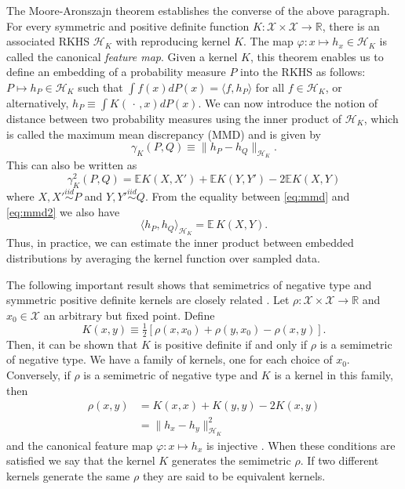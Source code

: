 \documentclass[aps,preprint,nofootinbib,floatfix]{revtex4-1}
\newcommand\E{\mathbb{E}}
\newcommand\kk{K}
\newcommand\kkk{h}
\newcommand\Hk{{\mathcal{H}}_{\kk}}
\begin{document}
The Moore-Aronszajn theorem 
\cite{Aronszajn}
establishes the converse of the above paragraph. 
For every symmetric
and positive definite function $\kk: \mathcal{X}\times \mathcal{X} \to
\mathbb{R}$, there is an associated RKHS $\Hk$ 
with reproducing
kernel $\kk$. The map $\varphi: x \mapsto \kkk_x \in \Hk$ is called
the canonical \emph{feature map}. Given a kernel $\kk$,
this theorem enables us to define an embedding of a probability measure
$P$ into the RKHS as follows: $P \mapsto \kkk_P \in
\Hk$ such that 
$\int f(x) d P(x) = \langle f, \kkk_P \rangle$ for all $f \in \Hk$,
or alternatively, $\kkk_P \equiv \int \kk( \, \cdot \,, x)  d P(x)$. 
We can now  introduce the 
notion of distance between two probability measures using the inner product
of $\Hk$, which is called the maximum mean discrepancy (MMD) and
is given by
\begin{equation}
\label{eq:mmd}
\gamma_\kk(P,Q) \equiv \| \kkk_P - \kkk_Q \|_{\Hk}.
\end{equation}
This can also be written as \cite{Gretton2012}
\begin{equation}\label{eq:mmd2}
\gamma_\kk^2(P,Q) = \E \kk(X,X') + \E \kk(Y,Y') - 2 \E \kk(X, Y)
\end{equation}
where $X,X' \stackrel{iid}{\sim} P$ and $Y,Y'\stackrel{iid}{\sim} Q$.
From the equality between \eqref{eq:mmd} and \eqref{eq:mmd2} we also
have 
\begin{equation}\label{eq:inner_data}
\langle \kkk_P, \kkk_Q \rangle_{\Hk} = \E \, \kk(X, Y).
\end{equation}
Thus, in practice, we can estimate the inner product between  
embedded distributions 
by averaging the kernel function over sampled data.

The following important result shows that semimetrics of negative
type and symmetric positive definite kernels are closely related
\cite{Berg1984}. Let $\rho: \mathcal{X} \times \mathcal{X} \to \mathbb{R}$
and $x_0 \in \mathcal{X}$ an arbitrary but fixed point.
Define
\begin{equation}
\label{eq:kernel_semimetric}
\kk(x,y) \equiv 
\tfrac{1}{2} \left[  \rho(x,x_0) + \rho(y,x_0) - \rho(x,y)\right].
\end{equation}
Then, it can be shown that 
$\kk$ is positive definite if and only if $\rho$ is a semimetric
of negative type.
We have a family of kernels, one for each choice of $x_0$. Conversely,
if $\rho$ is a semimetric of negative type and $\kk$ is a kernel in this
family, then 
\begin{equation}
\label{eq:gen_kernel}
\begin{split}
\rho(x,y) &= \kk(x,x) + \kk(y,y) -2\kk(x,y) \\
&=  \| \kkk_x - \kkk_y \|^2_{\Hk}
\end{split}
\end{equation}
and the canonical feature map 
$\varphi: x \mapsto \kkk_x$ is injective \cite{Sejdinovic2013}.
When these conditions are satisfied we say that the kernel $\kk$ 
generates the semimetric $\rho$. 
If two different kernels generate the same $\rho$ they are
said to be equivalent kernels.
\end{document}

